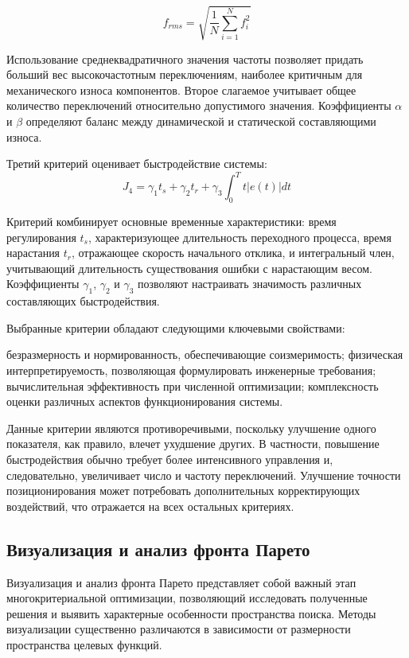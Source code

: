 \begin{equation}
	f_{rms} = \sqrt{\frac{1}{N}\sum_{i=1}^N f_i^2}
\end{equation}

Использование среднеквадратичного значения частоты позволяет
придать больший вес высокочастотным переключениям, наиболее
критичным для механического износа компонентов. Второе слагаемое
учитывает общее количество переключений относительно
допустимого значения. Коэффициенты $\alpha$ и $\beta$ определяют
баланс между динамической и статической составляющими износа.

Третий критерий оценивает быстродействие системы:
\begin{equation}
	J_4 = \gamma_1 t_s + \gamma_2 t_r + \gamma_3 \int_0^T t|e(t)|dt
\end{equation}

Критерий комбинирует основные временные характеристики:
время регулирования $t_s$, характеризующее длительность
переходного процесса, время нарастания $t_r$, отражающее
скорость начального отклика, и интегральный член,
учитывающий длительность существования ошибки с
нарастающим весом. Коэффициенты $\gamma_1$, $\gamma_2$ и $\gamma_3$ позволяют
настраивать значимость различных составляющих быстродействия.

Выбранные критерии обладают следующими ключевыми свойствами:

безразмерность и нормированность, обеспечивающие соизмеримость;
физическая интерпретируемость, позволяющая формулировать инженерные требования;
вычислительная эффективность при численной оптимизации;
комплексность оценки различных аспектов функционирования системы.

Данные критерии являются противоречивыми, поскольку улучшение
одного показателя, как правило, влечет ухудшение других.
В частности, повышение быстродействия обычно требует более интенсивного
управления и, следовательно, увеличивает
число и частоту переключений. Улучшение
точности позиционирования может потребовать дополнительных
корректирующих воздействий, что отражается на всех остальных критериях.


\subsection{Визуализация и анализ фронта Парето}\label{sec:ch4/sec6/subsec2}

Визуализация и анализ фронта Парето представляет собой важный этап многокритериальной оптимизации,
позволяющий исследовать полученные решения и выявить характерные особенности пространства
поиска. Методы визуализации существенно различаются в зависимости от размерности пространства целевых функций.

